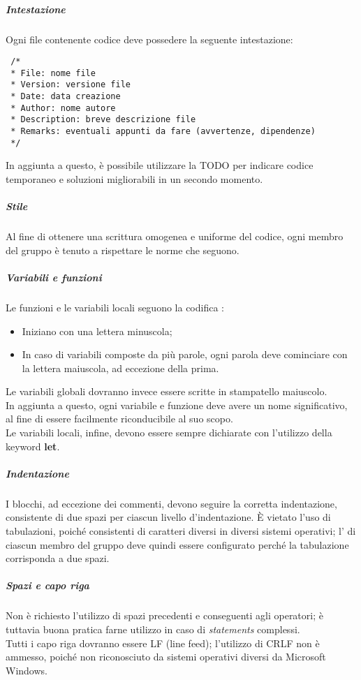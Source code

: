 \documentclass[../norme-di-progetto.tex]{subfiles}
\begin{document}
\subparagraph{Intestazione}
Ogni file contenente codice deve possedere la seguente intestazione:
\begin{lstlisting}
 /*
 * File: nome file
 * Version: versione file
 * Date: data creazione
 * Author: nome autore
 * Description: breve descrizione file
 * Remarks: eventuali appunti da fare (avvertenze, dipendenze)
 */
\end{lstlisting}
In aggiunta a questo, è possibile utilizzare la  TODO per indicare codice temporaneo e soluzioni migliorabili in un secondo momento.

\subparagraph{Stile}
Al fine di ottenere una scrittura omogenea e uniforme del codice, ogni membro del gruppo è tenuto a rispettare le norme che seguono.

\subparagraph*{Variabili e funzioni}
Le funzioni e le variabili locali seguono la codifica :
\begin{itemize}
  \item Iniziano con una lettera minuscola;
  \item In caso di variabili composte da più parole, ogni parola deve cominciare con la lettera maiuscola, ad eccezione della prima.
\end{itemize}
Le variabili globali dovranno invece essere scritte in stampatello maiuscolo. \\
In aggiunta a questo, ogni variabile e funzione deve avere un nome significativo, al fine di essere facilmente riconducibile al suo scopo. \\
Le variabili locali, infine, devono essere sempre dichiarate con l'utilizzo della keyword \textbf{let}.

\subparagraph*{Indentazione}
I blocchi, ad eccezione dei commenti, devono seguire la corretta indentazione, consistente di due spazi per ciascun livello d'indentazione. È vietato l'uso di tabulazioni, poiché consistenti di caratteri diversi in diversi sistemi operativi; l' di ciascun membro del gruppo deve quindi essere configurato perché la tabulazione corrisponda a due spazi.

\subparagraph*{Spazi e capo riga}
Non è richiesto l'utilizzo di spazi precedenti e conseguenti agli operatori; è tuttavia buona pratica farne utilizzo in caso di \textit{statements} complessi. \\
Tutti i capo riga dovranno essere LF (line feed); l'utilizzo di CRLF non è ammesso, poiché non riconosciuto da sistemi operativi diversi da Microsoft Windows.
\end{document}
